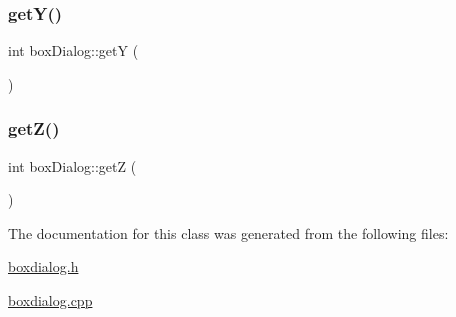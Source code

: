 \mbox{\label{classbox_dialog_a85e393c20b1187ffdce852378704a24c}} 
\subsubsection{\texorpdfstring{get\+Y()}{getY()}}
{\footnotesize\ttfamily int box\+Dialog\+::getY (\begin{DoxyParamCaption}{ }\end{DoxyParamCaption})}

\mbox{\label{classbox_dialog_a34b2ce0c94a9f2c486d877d64834b7e3}} 
\subsubsection{\texorpdfstring{get\+Z()}{getZ()}}
{\footnotesize\ttfamily int box\+Dialog\+::getZ (\begin{DoxyParamCaption}{ }\end{DoxyParamCaption})}



The documentation for this class was generated from the following files\+:\begin{DoxyCompactItemize}
\item 
\hyperlink{boxdialog_8h}{boxdialog.\+h}\item 
\hyperlink{boxdialog_8cpp}{boxdialog.\+cpp}\end{DoxyCompactItemize}
